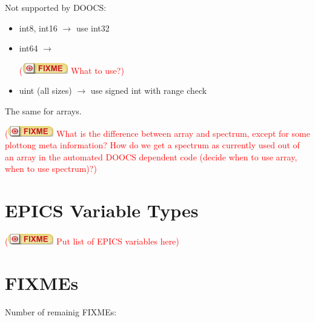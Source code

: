 \documentclass[11pt,a4paper]{scrartcl}
\newcounter{nFixmes}
\newcommand{\fixme}[1]{\addtocounter{nFixmes}{1}\textcolor{red}{(\includegraphics[height=2ex]{fixme} #1)}\xspace}
\begin{document}
Not supported by DOOCS:
\begin{itemize}
\item int8, int16 $\rightarrow$ use int32
\item int64 $\rightarrow$ \fixme{What to use?}
\item uint (all sizes) $\rightarrow$ use signed int with range check
\end{itemize}
The same for arrays.

\fixme{What is the difference between array and spectrum, except for some plottong meta information? How do we get a spectrum as currently used out of an array in the automated DOOCS dependent code (decide when to use array, when to use spectrum)?}

\section{EPICS Variable Types}
\fixme{Put list of EPICS variables here}

\section{FIXMEs}
Number of remainig FIXMEs: 
\end{document}
